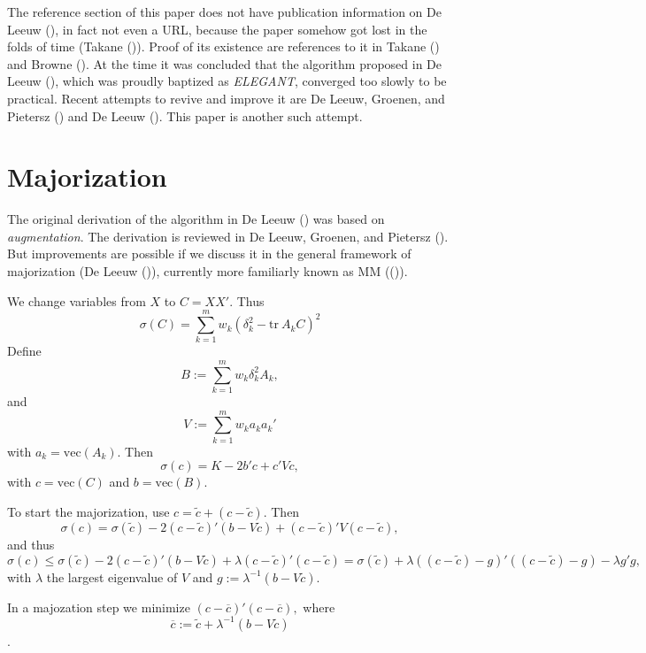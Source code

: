 \documentclass[
  12pt,
  letterpaper,
  DIV=11,
  numbers=noendperiod]{scrartcl}
\newcommand{\sectionbreak}{\clearpage}
\begin{document}
The reference section of this paper does not have publication
information on De Leeuw (), in fact
not even a URL, because the paper somehow got lost in the folds of time
(Takane ()). Proof of its existence are
references to it in Takane () and Browne
(). At the time it was concluded that the
algorithm proposed in De Leeuw (),
which was proudly baptized as \emph{ELEGANT}, converged too slowly to be
practical. Recent attempts to revive and improve it are De Leeuw,
Groenen, and Pietersz
() and De Leeuw
(). This paper is another such
attempt.

\sectionbreak

\section{Majorization}\label{majorization}

The original derivation of the algorithm in De Leeuw
() was based on \emph{augmentation}.
The derivation is reviewed in De Leeuw, Groenen, and Pietersz
(). But improvements
are possible if we discuss it in the general framework of majorization
(De Leeuw ()), currently more
familiarly known as MM (()).

We change variables from \(X\) to \(C=XX'\). Thus \[
\sigma(C)=\sum_{k=1}^m w_k(\delta_k^2-\text{tr}\ A_kC)^2
\] Define \[
B:=\sum_{k=1}^m w_k\delta_k^2A_k,
\] and \[
V:=\sum_{k=1}^m w_ka_ka_k'
\] with \(a_k=\text{vec}(A_k)\). Then \[
\sigma(c)=K-2b'c+c'Vc,
\] with \(c=\text{vec}(C)\) and \(b=\text{vec}(B)\).

To start the majorization, use \(c=\tilde c+(c-\tilde c)\). Then \[
\sigma(c)=\sigma(\tilde c)-2(c-\tilde c)'(b-V\tilde c)+(c-\tilde c)'V(c-\tilde c),
\] and thus \[
\sigma(c)\leq\sigma(\tilde c)-2(c-\tilde c)'(b-V\tilde c)+\lambda(c-\tilde c)'(c-\tilde c)=
\sigma(\tilde c)+\lambda((c-\tilde c)-g)'((c-\tilde c)-g)-\lambda g'g,
\] with \(\lambda\) the largest eigenvalue of \(V\) and
\(g:=\lambda^{-1}(b-V\tilde c)\).

In a majozation step we minimize \((c-\overline c)'(c-\overline c),\)
where \[\overline{c}:=\tilde c+\lambda^{-1}(b-V\tilde c)\].
\end{document}
